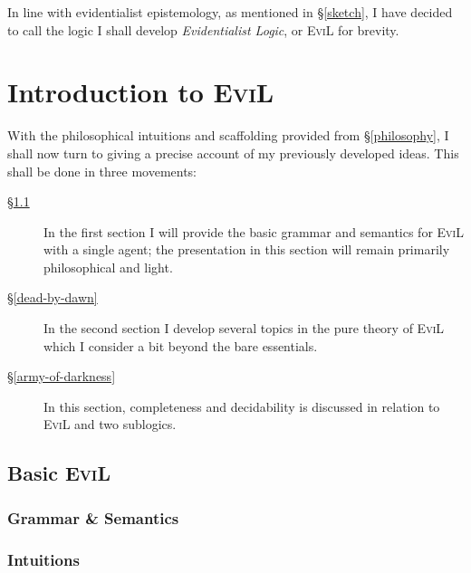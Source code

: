 \documentclass[11pt]{article}
\numberwithin{equation}{subsection}
\begin{document}
In line with evidentialist epistemology, as mentioned in
\S\ref{sketch}, I have decided to call the logic I shall develop
\emph{Evidentialist Logic}, or \textsc{EviL} for brevity.

\section{Introduction to \textsc{EviL}}\label{evil-semantics}
With the philosophical intuitions and scaffolding provided from
\S\ref{philosophy}, I shall now turn to giving a precise account of my previously
developed ideas.  This shall be done in three movements:
\begin{description}
 \item[\S\ref{basic-evil}]  In the first section I will provide the
   basic grammar and semantics for \textsc{EviL} with a single agent;
   the presentation in this section will remain primarily
   philosophical and light.
 \item[\S\ref{dead-by-dawn}]  In the second section I develop several
   topics in the pure theory of \textsc{EviL} which I consider a bit
   beyond the bare essentials.
  \item[\S\ref{army-of-darkness}]  In this section, completeness and
    decidability is discussed in relation to \textsc{EviL} and two sublogics.
\end{description}


\subsection{Basic \textsc{EviL}}\label{basic-evil}
\subsubsection{Grammar \& Semantics}\label{evil-grammar}

\subsubsection{Intuitions}

\end{document}
